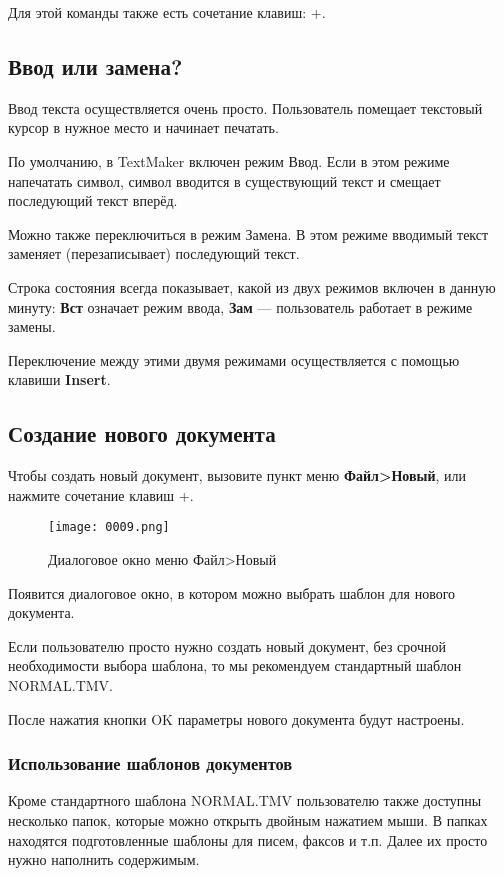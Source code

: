\documentclass[a4paper,10pt]{article}
\begin{document}
Для этой команды также есть сочетание клавиш: +.

\subsection{Ввод или замена?}
Ввод текста осуществляется очень просто. Пользователь помещает текстовый курсор в нужное место и начинает печатать.

По умолчанию, в TextMaker включен режим Ввод. Если в этом режиме напечатать символ, символ вводится в существующий текст и смещает последующий текст вперёд.

Можно также переключиться в режим Замена. В этом режиме вводимый текст заменяет (перезаписывает) последующий текст.

Строка состояния всегда показывает, какой из двух режимов включен в данную минуту: \textbf{Вст} означает режим ввода, \textbf{Зам} --- пользователь работает в режиме замены.

Переключение между этими двумя режимами осуществляется с помощью клавиши \textbf{Insert}.

\subsection{Создание нового документа}
Чтобы создать новый документ, вызовите пункт меню \textbf{Файл>Новый}, или нажмите сочетание клавиш +.

\begin{figure}[ht]
\texttt{[image: 0009.png]}
\centering
\caption{Диалоговое окно меню Файл>Новый}
\end{figure}

Появится диалоговое окно, в котором можно выбрать шаблон для нового документа. 

Если пользователю просто нужно создать новый документ, без срочной необходимости выбора шаблона, то мы рекомендуем стандартный шаблон NORMAL.TMV.

После нажатия кнопки OK параметры нового документа будут настроены.

\subsubsection{Использование шаблонов документов}
Кроме стандартного шаблона NORMAL.TMV пользователю также доступны несколько папок, которые можно открыть двойным нажатием мыши. В папках находятся подготовленные шаблоны для писем, факсов и т.п. Далее их просто нужно наполнить содержимым.
\end{document}
